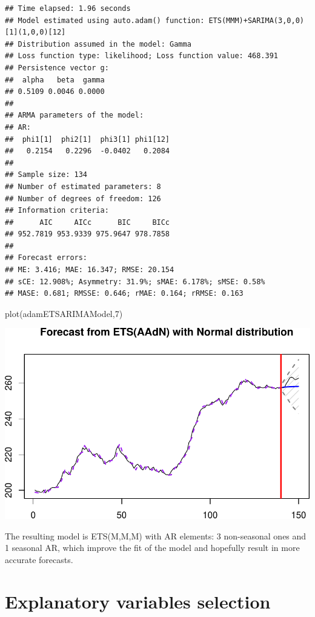 \documentclass[
]{book}
\newenvironment{Shaded}{\begin{snugshade}}{\end{snugshade}}
\newcommand{\DecValTok}[1]{\textcolor[rgb]{0.00,0.00,0.81}{#1}}
\newcommand{\FunctionTok}[1]{\textcolor[rgb]{0.00,0.00,0.00}{#1}}
\newcommand{\NormalTok}[1]{#1}
\theoremstyle{definition}
\theoremstyle{definition}
\theoremstyle{definition}
\theoremstyle{definition}
\theoremstyle{remark}
\begin{document}
\begin{verbatim}
## Time elapsed: 1.96 seconds
## Model estimated using auto.adam() function: ETS(MMM)+SARIMA(3,0,0)[1](1,0,0)[12]
## Distribution assumed in the model: Gamma
## Loss function type: likelihood; Loss function value: 468.391
## Persistence vector g:
##  alpha   beta  gamma 
## 0.5109 0.0046 0.0000 
## 
## ARMA parameters of the model:
## AR:
##  phi1[1]  phi2[1]  phi3[1] phi1[12] 
##   0.2154   0.2296  -0.0402   0.2084 
## 
## Sample size: 134
## Number of estimated parameters: 8
## Number of degrees of freedom: 126
## Information criteria:
##      AIC     AICc      BIC     BICc 
## 952.7819 953.9339 975.9647 978.7858 
## 
## Forecast errors:
## ME: 3.416; MAE: 16.347; RMSE: 20.154
## sCE: 12.908%; Asymmetry: 31.9%; sMAE: 6.178%; sMSE: 0.58%
## MASE: 0.681; RMSSE: 0.646; rMAE: 0.164; rRMSE: 0.163
\end{verbatim}

\begin{Shaded}
\begin{Highlighting}[]
\FunctionTok{plot}\NormalTok{(adamETSARIMAModel,}\DecValTok{7}\NormalTok{)}
\end{Highlighting}
\end{Shaded}

\includegraphics{adam_files/figure-latex/unnamed-chunk-177-1.pdf}

The resulting model is ETS(M,M,M) with AR elements: 3 non-seasonal ones and 1 seasonal AR, which improve the fit of the model and hopefully result in more accurate forecasts.

\hypertarget{ETSXSelection}{%
\section{Explanatory variables selection}\label{ETSXSelection}}
\end{document}
